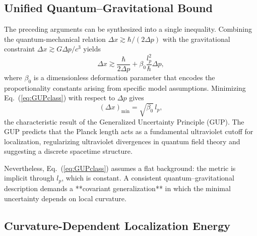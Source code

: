 \documentclass[11pt,oneside]{book}
\numberwithin{equation}{chapter}
\begin{document}
\subsection*{Unified Quantum--Gravitational Bound}

The preceding arguments can be synthesized into a single inequality.  
Combining the quantum-mechanical relation $\Delta x \gtrsim \hbar/(2\Delta p)$ with the gravitational constraint $\Delta x \gtrsim G\Delta p/c^3$ yields
\begin{equation}
\Delta x \gtrsim \frac{\hbar}{2\Delta p}+\beta_0\frac{l_p^2}{\hbar}\Delta p,
\label{eq:GUPclass}
\end{equation}
where $\beta_0$ is a dimensionless deformation parameter that encodes the proportionality constants arising from specific model assumptions.  
Minimizing Eq.~(\ref{eq:GUPclass}) with respect to $\Delta p$ gives
\begin{equation}
(\Delta x)_{\min}=\sqrt{\beta_0}\,l_p,
\label{eq:GUPmin}
\end{equation}
the characteristic result of the Generalized Uncertainty Principle (GUP).  
The GUP predicts that the Planck length acts as a fundamental ultraviolet cutoff for localization, regularizing ultraviolet divergences in quantum field theory and suggesting a discrete spacetime structure.

Nevertheless, Eq.~(\ref{eq:GUPclass}) assumes a flat background: the metric is implicit through $l_p$, which is constant.  
A consistent quantum--gravitational description demands a **covariant generalization** in which the minimal uncertainty depends on local curvature.

\subsection*{Curvature-Dependent Localization Energy}
\end{document}
